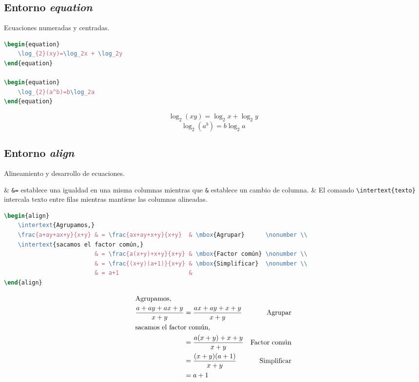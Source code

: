 \subsection{Entorno \textit{equation}}
Ecuaciones numeradas y centradas.

\begin{lstlisting}[language=tex, caption={}, label={}]
\begin{equation}
	\log_{2}(xy)=\log_2x + \log_2y
\end{equation}

\begin{equation}
	\log_{2}(a^b)=b\log_2a
\end{equation}
\end{lstlisting}

\begin{equation}
\log_{2}(xy)=\log_2x + \log_2y
\end{equation}
\begin{equation}
\log_{2}(a^b)=b\log_2a
\end{equation}


\subsection{Entorno \textit{align}}
Alineamiento y desarrollo de ecuaciones.

\Activate
\begin{easylist}[itemize]	
	& \verb|&=| establece una igualdad en una misma columnas mientras que \verb|&| establece un cambio de columna.
	& El comando \verb|\intertext{texto}| intercala texto entre filas mientras mantiene las columnas alineadas.	
\end{easylist}
\Deactivate

\begin{lstlisting}[language=tex, caption={}, label={}]
\begin{align}
	\intertext{Agrupamos,}
	\frac{a+ay+ax+y}{x+y} & = \frac{ax+ay+x+y}{x+y}  & \mbox{Agrupar}      \nonumber \\ 
	\intertext{sacamos el factor común,}
	                      & = \frac{a(x+y)+x+y}{x+y} & \mbox{Factor común} \nonumber \\
	                      & = \frac{(x+y)(a+1)}{x+y} & \mbox{Simplificar}  \nonumber \\
	                      & = a+1                    &
\end{align}
\end{lstlisting}

\begin{align}
	\intertext{Agrupamos,}
	\frac{a+ay+ax+y}{x+y} & = \frac{ax+ay+x+y}{x+y}  & \mbox{Agrupar}      \nonumber \\ 
	\intertext{sacamos el factor común,}
	                      & = \frac{a(x+y)+x+y}{x+y} & \mbox{Factor común} \nonumber \\
	                      & = \frac{(x+y)(a+1)}{x+y} & \mbox{Simplificar}  \nonumber \\
	                      & = a+1                    &
\end{align}


